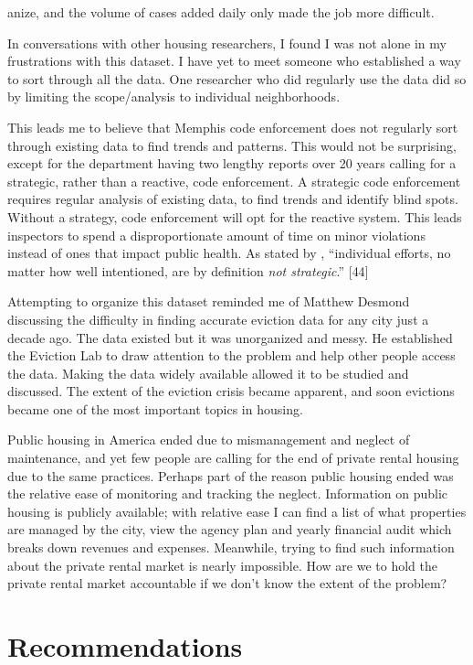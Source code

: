\documentclass[
]{book}
\begin{document}
anize, and the volume of cases added daily only made the job more difficult.

In conversations with other housing researchers, I found I was not alone in my frustrations with this dataset. I have yet to meet someone who established a way to sort through all the data. One researcher who did regularly use the data did so by limiting the scope/analysis to individual neighborhoods.

This leads me to believe that Memphis code enforcement does not regularly sort through existing data to find trends and patterns. This would not be surprising, except for the department having two lengthy reports over 20 years calling for a strategic, rather than a reactive, code enforcement. A strategic code enforcement requires regular analysis of existing data, to find trends and identify blind spots. Without a strategy, code enforcement will opt for the reactive system. This leads inspectors to spend a disproportionate amount of time on minor violations instead of ones that impact public health. As stated by \citet{betts2001}, ``individual efforts, no matter how well intentioned, are by definition \emph{not strategic}.'' {[}44{]}

Attempting to organize this dataset reminded me of Matthew Desmond discussing the difficulty in finding accurate eviction data for any city just a decade ago. The data existed but it was unorganized and messy. He established the Eviction Lab to draw attention to the problem and help other people access the data. Making the data widely available allowed it to be studied and discussed. The extent of the eviction crisis became apparent, and soon evictions became one of the most important topics in housing.

Public housing in America ended due to mismanagement and neglect of maintenance, and yet few people are calling for the end of private rental housing due to the same practices. Perhaps part of the reason public housing ended was the relative ease of monitoring and tracking the neglect. Information on public housing is publicly available; with relative ease I can find a list of what properties are managed by the city, view the agency plan and yearly financial audit which breaks down revenues and expenses. Meanwhile, trying to find such information about the private rental market is nearly impossible. How are we to hold the private rental market accountable if we don't know the extent of the problem?

\hypertarget{recommendations}{%
\section{Recommendations}\label{recommendations}}
\end{document}
